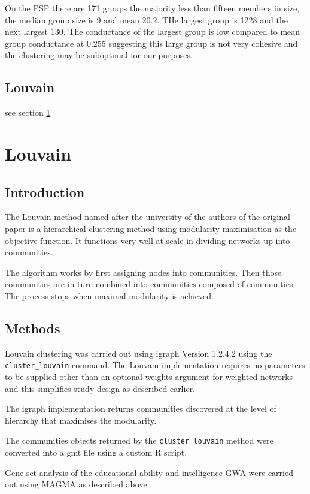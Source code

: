 On the PSP there are 171 groups the majority less than fifteen members in size, the median group size is 9 and mean 20.2. THe largest group is 1228 and the next largest 130. The conductance of the largest group is low compared to mean group conductance at 0.255 suggesting this large group is not very cohesive and the clustering may be suboptimal for our purposes. 

\subsection{Louvain}
see section \ref{sec:Louvain}

\section{Louvain}
\label{sec:Louvain}

\subsection{Introduction}
The Louvain method named after the university of the authors of the original paper is a hierarchical clustering method using modularity maximisation as the objective function. It functions very well at scale in dividing networks up into communities.\cite{blondel2008fast}

The algorithm works by first assigning nodes into communities. Then those communities are in turn combined into communities composed of communities. The process stops when maximal modularity is achieved. 

\subsection{Methods}

Louvain clustering was carried out using igraph Version 1.2.4.2 using the \texttt{cluster\_louvain} command. The Louvain implementation requires no parameters to be supplied other than an optional weights argument for weighted networks and this simplifies study design as described earlier. 

The igraph implementation returns communities discovered at the level of hierarchy that maximises the modularity.

The communities objects returned by the \texttt{cluster\_louvain} method were converted into a gmt file using a custom R script.

Gene set analysis of the educational ability and intelligence GWA were carried out using MAGMA as described above . 
\cite{blondel2008fast}

